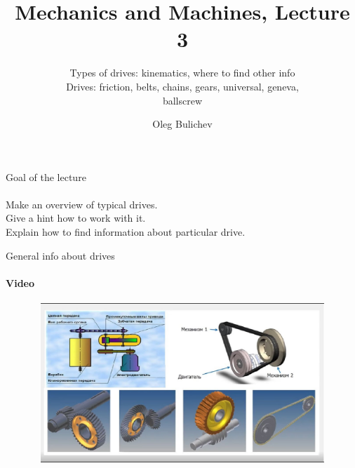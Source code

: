 \documentclass[aspectratio=169]{beamer}
\title[MaM]{Mechanics and Machines, Lecture 3} %
\subtitle{Types of drives: kinematics, where to find other info
\\ Drives: friction, belts, chains, gears, universal, geneva,       \\ ballscrew  
         } %
\author{Oleg Bulichev}
\newcommand{\fbckg}[1]{\usebackgroundtemplate{\texttt{[image: \#1]}}}%
\begin{document}
\setlength{\abovedisplayskip}{0pt}
\setlength{\belowdisplayskip}{0pt}
\setlength{\abovedisplayshortskip}{0pt}
\setlength{\belowdisplayshortskip}{0pt}

\fbckg{fibeamer/figs/title_page.png}

\fbckg{fibeamer/figs/common.png}

\note{\scriptsize \begin{itemize}
        \item \
    \end{itemize}}

\begin{frame}[c]{Goal of the lecture}
    \framesubtitle{}
    \LARGE
    \centering
    Make an overview of typical drives. \\ Give a hint how to work with it. \\ Explain how to find information about particular drive.
\end{frame}

\begin{frame}[t]{General info about drives}
    \framesubtitle{Video}
    \vspace{-0.6cm}
    \begin{figure}[H]
        \href{https://youtu.be/XOh8qfXDRIs}{
            \centering\includegraphics[height=6cm,width=1\textwidth,keepaspectratio]{drives_preview.jpg}}
        \label{fig:drives_preview.jpg}
    \end{figure}
\end{frame}
\end{document}
